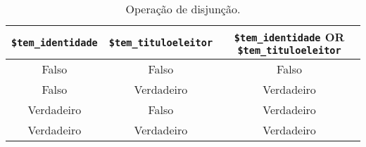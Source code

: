 \begin{table}[h]
\caption{Operação de disjunção.}\label{tab:cap4-operacao-de-disjuncao}
\begin{center}
\begin{tabular}{|c|c|c|}
\hline
  \multicolumn{1}{|c|}{ \textbf{\texttt{\$tem\_identidade}}}
&  \multicolumn{1}{|c|}{ \textbf{\texttt{\$tem\_tituloeleitor}}}
&  \multicolumn{1}{|c|}{ \textbf{\texttt{\$tem\_identidade} OR \texttt{\$tem\_tituloeleitor}}} \\
\hline
\hline
Falso  & Falso & Falso\\ \hline
Falso  & Verdadeiro & Verdadeiro\\ \hline
Verdadeiro  & Falso & Verdadeiro\\ \hline
Verdadeiro  & Verdadeiro & Verdadeiro\\ \hline
\end{tabular}
\end{center}
\end{table}
